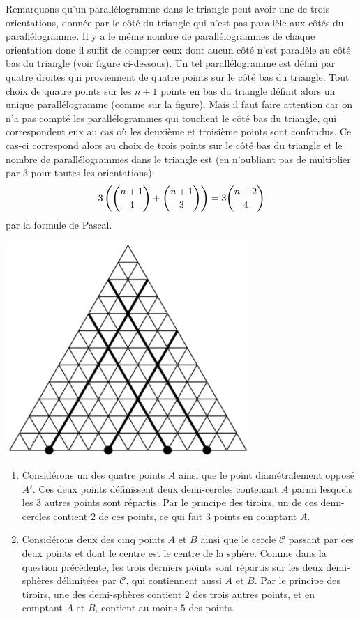 \begin{sol}
Remarquons qu'un parallélogramme dans le triangle peut avoir une de trois orientations, donnée par le côté du triangle qui n'est pas parallèle aux côtés du parallélogramme. Il y a le même nombre de parallélogrammes de chaque orientation donc il suffit de compter ceux dont aucun côté n'est parallèle au côté bas du triangle (voir figure ci-dessous). Un tel parallélogramme est défini par quatre droites qui proviennent de quatre points sur le côté bas du triangle. Tout choix de quatre points sur les $n+1$ points en bas du triangle définit alors un unique parallélogramme (comme sur la figure). Mais il faut faire attention car on n'a pas compté les parallélogrammes qui touchent le côté bas du triangle, qui correspondent eux au cas où les deuxième et troisième points sont confondus. Ce cas-ci correspond alors au choix de trois points sur le côté bas du triangle et le nombre de parallélogrammes dans le triangle est (en n'oubliant pas de multiplier par $3$ pour toutes les orientations):
$$3\left(\dbinom{n+1}4+\dbinom{n+1}3\right)=3\dbinom{n+2}4$$
par la formule de Pascal.

\begin{center}
\includegraphics[]{B-23-PM-img.PNG}
\end{center}
\end{sol}

\begin{sol}
\begin{enumerate}
    \item Considérons un des quatre points $A$ ainsi que le point diamétralement opposé $A'$. Ces deux points définissent deux demi-cercles contenant $A$ parmi lesquels les $3$ autres points sont répartis. Par le principe des tiroirs, un de ces demi-cercles contient $2$ de ces points, ce qui fait $3$ points en comptant $A$.
    \item Considérons deux des cinq points $A$ et $B$ ainsi que le cercle $\mathcal{C}$ passant par ces deux points et dont le centre est le centre de la sphère. Comme dans la question précédente, les trois derniers points sont répartis sur les deux demi-sphères délimitées par $\mathcal{C}$, qui contiennent aussi $A$ et $B$. Par le principe des tiroirs, une des demi-sphères contient $2$ des trois autres points, et en comptant $A$ et $B$, contient au moins $5$ des points.
\end{enumerate}
\end{sol}

